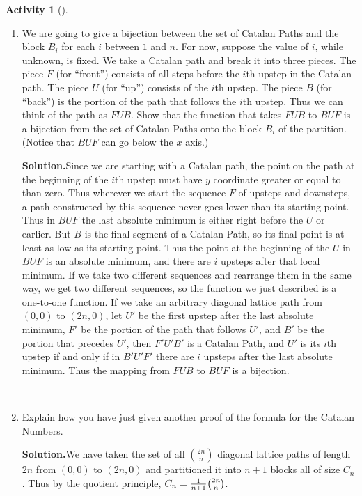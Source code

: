 \documentclass[10pt,]{book}
\theoremstyle{plain}
\theoremstyle{definition}
\newtheorem{activity}[project]{Activity}
\numberwithin{equation}{chapter}
\begin{document}
\begin{activity}[]
\begin{enumerate}[label=(\alph*)]
~\par
\item We are going to give a bijection between the set of Catalan Paths and the block \(B_i\) for each \(i\) between \(1\) and \(n\).  For now, suppose the value of \(i\), while unknown, is fixed.  We take a Catalan path and break it into three pieces.  The piece \(F\) (for ``front'') consists of all steps before the \(i\)th upstep in the Catalan path.  The piece \(U\) (for ``up'') consists of the \(i\)th upstep.  The piece \(B\) (for ``back'') is the portion of the path that follows the \(i\)th upstep.  Thus we can think of the path as \(FUB\).  Show that the function that takes \(FUB\) to \(BUF\) is a bijection from the set of Catalan Paths onto the block \(B_i\) of the partition.  (Notice that \(BUF\) can go below the \(x\) axis.)%
\par\medskip\noindent%
\textbf{Solution.}\quad Since we are starting with a Catalan path, the point on the path at the beginning of the \(i\)th upstep must have \(y\) coordinate greater or equal to than zero. Thus wherever we start the sequence \(F\) of upsteps and downsteps, a path constructed by this sequence never goes lower than its starting point. Thus in \(BUF\) the last absolute minimum is either right before the \(U\) or earlier. But \(B\) is the final segment of a Catalan Path, so its final point is at least as low as its starting point. Thus the point at the beginning of the \(U\) in \(BUF\) is an absolute minimum, and there are \(i\) upsteps after that local minimum. If we take two different sequences and rearrange them in the same way, we get two different sequences, so the function we just described is a one-to-one function. If we take an arbitrary diagonal lattice path from \((0,0)\) to \((2n,0)\), let \(U'\) be the first upstep after the last absolute minimum, \(F'\) be the portion of the path that follows \(U'\), and \(B'\) be the portion that precedes \(U'\), then \(F'U'B'\) is a Catalan Path, and \(U'\) is its \(i\)th upstep if and only if in \(B'U'F'\) there are \(i\) upsteps after the last absolute minimum. Thus the mapping from \(FUB\) to \(BUF\) is a bijection.%

~\par
\item Explain how you have just given another proof of the formula for the Catalan Numbers.%
\par\medskip\noindent%
\textbf{Solution.}\quad We have taken the set of all \(2n\choose n\) diagonal lattice paths of length \(2n\) from \((0,0)\) to \((2n,0)\) and partitioned it into \(n+1\) blocks all of size \(C_n\). Thus by the quotient principle, \(C_n={1\over
n+1}{2n
\choose n}\).%

\end{enumerate}
\end{activity}
\typeout{************************************************}
\typeout{************************************************}
\end{document}
